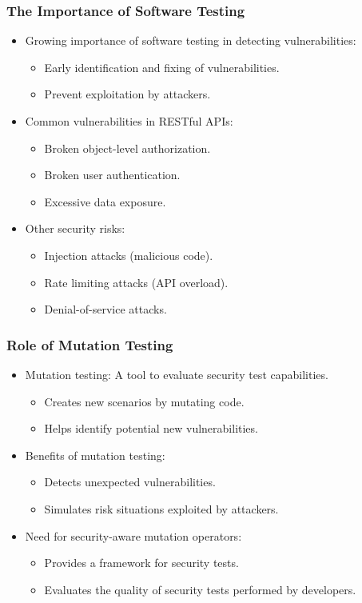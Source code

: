 \documentclass[10pt]{beamer}
\theoremstyle{remark}
\theoremstyle{definition}
\begin{document}
\begin{frame}[allowframebreaks]
    \frametitle{The Importance of Software Testing}
    \begin{itemize}
        \item Growing importance of software testing in detecting vulnerabilities:
        \begin{itemize}
            \item Early identification and fixing of vulnerabilities.
            \item Prevent exploitation by attackers.
        \end{itemize}
        \item Common vulnerabilities in RESTful APIs:
        \begin{itemize}
            \item Broken object-level authorization.
            \item Broken user authentication.
            \item Excessive data exposure.
        \end{itemize}
        \item Other security risks:
        \begin{itemize}
            \item Injection attacks (malicious code).
            \item Rate limiting attacks (API overload).
            \item Denial-of-service attacks.
        \end{itemize}
    \end{itemize}
\end{frame}

\begin{frame}[allowframebreaks]
    \frametitle{Role of Mutation Testing}
    \begin{itemize}
        \item Mutation testing: A tool to evaluate security test capabilities.
        \begin{itemize}
            \item Creates new scenarios by mutating code.
            \item Helps identify potential new vulnerabilities.
        \end{itemize}
        \item Benefits of mutation testing:
        \begin{itemize}
            \item Detects unexpected vulnerabilities.
            \item Simulates risk situations exploited by attackers.
        \end{itemize}
        \item Need for security-aware mutation operators:
        \begin{itemize}
            \item Provides a framework for security tests.
            \item Evaluates the quality of security tests performed by developers.
        \end{itemize}
    \end{itemize}
\end{frame}
\end{document}
